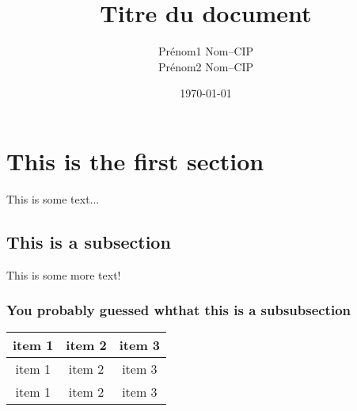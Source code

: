 \documentclass[a11paper, 11pt]{article}
\title{Titre du document}
\author{
  \addtolength{\tabcolsep}{-0.4em}
  \begin{tabular}{rcl} %
  Prénom1 Nom    & -- & CIP \\
  Prénom2 Nom    & -- & CIP \\
  \end{tabular}
}
\date{\today}
\begin{document}
\maketitle
\newpage
\tableofcontents

\section{This is the first section}
This is some text...

\subsection{This is a subsection}
This is some more text!


\subsubsection{You probably guessed whthat this is a subsubsection}

\begin{table}[h!]
  \begin{tabular}{c c c}
    \hline
    item 1 &  item 2 &  item 3 \\ \hline \hline
    item 1 &  item 2 &  item 3 \\
    item 1 &  item 2 &  item 3 \\
  \end{tabular}
\end{table}

\end{document}
